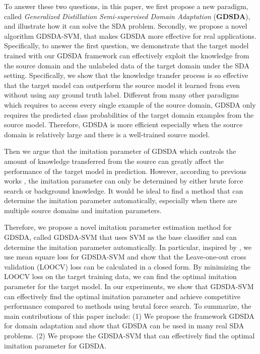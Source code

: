 To answer these two questions, in this paper, we first propose a new paradigm, called \textit{Generalized Distillation Semi-supervised Domain Adaptation} (\textbf{GDSDA}), and illustrate how it can solve the SDA problem. Secondly, we propose a novel algorithm GDSDA-SVM, that makes GDSDA more effective for real applications. Specifically, to answer the first question, we demonstrate that the target model trained with our GDSDA framework can effectively exploit the knowledge from the source domain and the unlabeled data of the target domain under the SDA setting. Specifically, we show that the knowledge transfer process is so effective that the target model can outperform the source model it learned from even without using any ground truth label. 
Different from many other paradigms which requires to access every single example of the source domain, GDSDA only requires the predicted class probabilities of the target domain examples from the source model. Therefore, GDSDA is more efficient especially when the source domain is relatively large and there is a well-trained source model.

Then we argue that the imitation parameter of GDSDA which controls the amount of knowledge transferred from the source can greatly affect the performance of the target model in prediction.
However, according to previous works \cite{lopez2015unifying,Tzeng_2015_ICCV}, the imitation parameter can only be determined by either brute force search or background knowledge. It would be ideal to find a method that can determine the imitation parameter automatically, especially when there are multiple source domains and imitation parameters.

Therefore, we propose a novel imitation parameter estimation method for GDSDA, called GDSDA-SVM that uses SVM as the base classifier and can determine the imitation parameter automatically. In particular, inspired by \cite{cawley2006leave}, we use mean square loss for GDSDA-SVM and show that the Leave-one-out cross validation (LOOCV) loss can be calculated in a closed form. By minimizing the LOOCV loss on the target training data, we can find the optimal imitation parameter for the target model. In our experiments, we show that GDSDA-SVM can effectively find the optimal imitation parameter and achieve competitive performance compared to methods using brutal force search. To summarize, the main contributions of this paper include: (1) We propose the framework GDSDA for domain adaptation and show that GDSDA can be used in many real SDA problems. (2) We propose the GDSDA-SVM that can effectively find the optimal imitation parameter for GDSDA.

